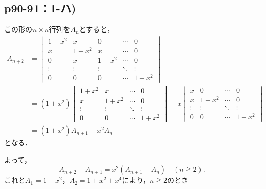 \documentclass[uplatex,dvipdfmx,a4paper,11pt,fleqn]{jsarticle}
\begin{document}
    \subsection*{p90-91：1-ハ)}
    
\begin{tleftbar}
    この形の$n\times n $行列を$A_n$とすると，
    \begin{align*} 
        A_{n+2} & = 
        \begin{vmatrix} 
            1+x^2 & x & 0& \cdots & 0 \\
             x & 1+x^2 & x & \cdots & 0 \\
            0 & x & 1+x^2 & \cdots & 0 \\
            \vdots & \vdots & \vdots & \ddots & \vdots \\
            0 & 0 & 0 & \cdots & 1+x^2 
            \end{vmatrix} \\
     & = (1+x^2)
     \begin{vmatrix}
        1+x^2 & x & \cdots & 0 \\
        x & 1+x^2 & \cdots & 0 \\
        \vdots & \vdots & \ddots & \vdots \\
        0 & 0 & \cdots & 1+x^2
     \end{vmatrix} 
     -x \begin{vmatrix}
        x & 0 & \cdots & 0 \\
        x & 1+x^2 & \cdots & 0 \\
        \vdots & \vdots & \ddots & \vdots \\
        0 & 0 & \cdots & 1+x^2
     \end{vmatrix}
     \\
     & = (1+x^2) A_{n+1} -x^2 A_n  
    \end{align*}
    となる．
    
    よって，
    \[
    A_{n+2}-A_{n+1}=x^2 (A_{n+1}-A_n)\quad ( n \geqq 2) .
    \]
    これと$ A_1=1+x^2$，$ A_2 = 1+x^2 + x^4$により，$n \geqq 2$のとき
    

\end{tleftbar}
\end{document}
